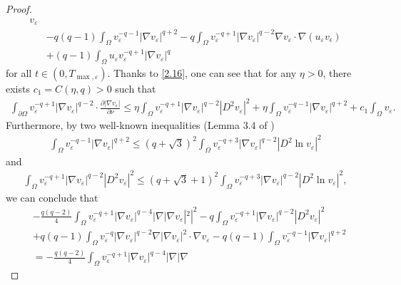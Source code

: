 \documentclass[12pt]{article}
\theoremstyle{plain}
\theoremstyle{definition}
\numberwithin{equation}{section}
\begin{document}
\begin{proof}
\begin{align}
        v_{\varepsilon}\nonumber\\
        &-q(q-1)\int_{\Omega}v_{\varepsilon}^{-q-1}|\nabla v_{\varepsilon}|^{q+2}-q\int_{\Omega}v_{\varepsilon}^{-q+1}|\nabla
        v_{\varepsilon}|^{q-2}\nabla v_{\varepsilon}\cdot\nabla (u_{\varepsilon} v_{\epsilon})\nonumber\\
        &+(q-1)\int_{\Omega}u_{\varepsilon}v_{\varepsilon}^{-q+1}|\nabla v_{\varepsilon}|^{q}
    \end{align}
    for all $t \in(0, T_{\max, \varepsilon})$. Thanks to \eqref{2.16}, one can see that for any $\eta>0$, there exists $c_1=C(\eta,q)>0$  such that
    \begin{align}\label{2.32}
        \int_{\partial\Omega}v_{\varepsilon}^{-q+1}|\nabla v_{\varepsilon}|^{q-2}\cdot\frac{\partial|\nabla v_{\varepsilon}|}{\partial\nu}\leq
        \eta \int_{\Omega}v_{\varepsilon}^{-q+1}|\nabla
        v_{\varepsilon}|^{q-2}|D^2v_{\varepsilon}|^2+\eta\int_{\Omega}v_{\varepsilon}^{-q-1}|\nabla
        v_{\varepsilon}|^{q+2}+c_1\int_{\Omega}v_{\varepsilon}.
    \end{align}
    Furthermore, by two well-known inequalities (Lemma 3.4 of \cite{WDCDSB})
    \begin{align}\label{2.33}
    \int_{\Omega}v_{\varepsilon}^{-q-1}|\nabla v_{\varepsilon}|^{q+2}\leq (q+\sqrt{3})^2\int_{\Omega}v_{\varepsilon}^{-q+3}|\nabla
    v_{\varepsilon}|^{q-2}|D^2 \ln v_{\varepsilon}|^2
    \end{align}
    and
    \begin{align}\label{2.34}
    \int_{\Omega}v_{\varepsilon}^{-q+1}|\nabla v_{\varepsilon}|^{q-2}|D^2 v_{\varepsilon}|^2\leq
    (q+\sqrt{3}+1)^2\int_{\Omega}v_{\varepsilon}^{-q+3}|\nabla v_{\varepsilon}|^{q-2}|D^2 \ln v_{\varepsilon}|^2,
    \end{align}
    we can conclude  that
    \begin{align}\label{2.35}
        &-\frac{q(q-2)}{4}\int_{\Omega}v_{\varepsilon}^{-q+1}|\nabla v_{\varepsilon}|^{q-4}|\nabla |\nabla
        v_{\varepsilon}|^2|^2-q\int_{\Omega}v_{\varepsilon}^{-q+1}|\nabla v_{\varepsilon}|^{q-2}|D^2 v_{\varepsilon}|^2\nonumber\\
        &+q(q-1)\int_{\Omega}v_{\varepsilon}^{-q}|\nabla v_{\varepsilon}|^{q-2}\nabla |\nabla v_{\varepsilon}|^2\cdot\nabla
        v_{\varepsilon}-q(q-1)\int_{\Omega}v_{\varepsilon}^{-q-1}|\nabla v_{\varepsilon}|^{q+2}\nonumber\\
        &=-\frac{q(q-2)}{4}\int_{\Omega}v_{\varepsilon}^{-q+1}|\nabla v_{\varepsilon}|^{q-4}|\nabla |\nabla

\end{align}
\end{proof}
\end{document}
